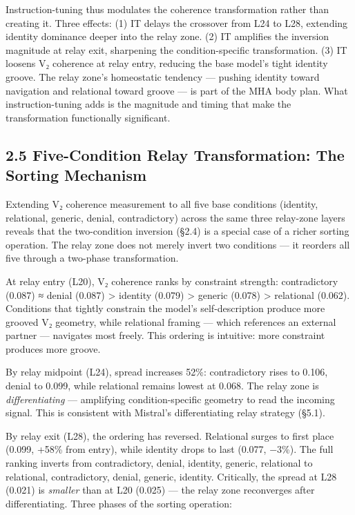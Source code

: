 \documentclass[12pt]{article}
\begin{document}
Instruction-tuning thus modulates the coherence transformation rather than creating it. Three effects: (1) IT delays the crossover from L24 to L28, extending identity dominance deeper into the relay zone. (2) IT amplifies the inversion magnitude at relay exit, sharpening the condition-specific transformation. (3) IT loosens V₂ coherence at relay entry, reducing the base model's tight identity groove. The relay zone's homeostatic tendency — pushing identity toward navigation and relational toward groove — is part of the MHA body plan. What instruction-tuning adds is the magnitude and timing that make the transformation functionally significant.

\subsection*{2.5 Five-Condition Relay Transformation: The Sorting Mechanism}

Extending V₂ coherence measurement to all five base conditions (identity, relational, generic, denial, contradictory) across the same three relay-zone layers reveals that the two-condition inversion (§2.4) is a special case of a richer sorting operation. The relay zone does not merely invert two conditions — it reorders all five through a two-phase transformation.

At relay entry (L20), V₂ coherence ranks by constraint strength: contradictory (0.087) ≈ denial (0.087) > identity (0.079) > generic (0.078) > relational (0.062). Conditions that tightly constrain the model's self-description produce more grooved V₂ geometry, while relational framing — which references an external partner — navigates most freely. This ordering is intuitive: more constraint produces more groove.

By relay midpoint (L24), spread increases 52\%: contradictory rises to 0.106, denial to 0.099, while relational remains lowest at 0.068. The relay zone is \textit{differentiating} — amplifying condition-specific geometry to read the incoming signal. This is consistent with Mistral's differentiating relay strategy (§5.1).

By relay exit (L28), the ordering has reversed. Relational surges to first place (0.099, +58\% from entry), while identity drops to last (0.077, −3\%). The full ranking inverts from {contradictory, denial, identity, generic, relational} to {relational, contradictory, denial, generic, identity}. Critically, the spread at L28 (0.021) is \textit{smaller} than at L20 (0.025) — the relay zone reconverges after differentiating. Three phases of the sorting operation:
\end{document}
